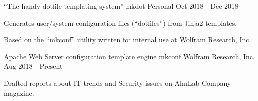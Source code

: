 

\begin{cventries}

  \cventry
    {``The handy dotfile templating system''} %
    {mkdot} %
    {Personal} %
    {Oct 2018 - Dec 2018} %
    {
      \begin{cvitems} %
        \item {Generates user/system configuration files (``dotfiles'') from Jinja2 templates.}
        \item {Based on the ``mkconf'' utility written for internal use at Wolfram Research, Inc.}
      \end{cvitems}
    }

  \cventry
    {Apache Web Server configuration template engine} %
    {mkconf} %
    {Wolfram Research, Inc.} %
    {Aug 2018 - Present} %
    {
      \begin{cvitems} %
        \item {Drafted reports about IT trends and Security issues on AhnLab Company magazine.}
      \end{cvitems}
    }

\end{cventries}
